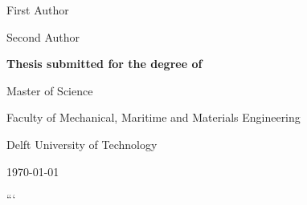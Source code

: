 \begin{titlepage}
\begin{center}
    \vspace{4mm}

    {\large
        First Author
        \par
    }

    \vspace{2mm}

    {\large
        Second Author
        \par
    }

\end{center}


\vfill



\begin{center}

    {\large
        \textbf{Thesis submitted for the degree of}
        \par
    }

    \vspace{2mm}

    {\large
        Master of Science
        \par
    }

    \vspace{8mm}

    {\large
        Faculty of Mechanical, Maritime and Materials Engineering
        \par
    }

    \vspace{2mm}

    {\large
        Delft University of Technology
        \par
    }

    \vspace{8mm}

    {\large
        \today
        \par
    }

\end{center}

\end{titlepage}
```
